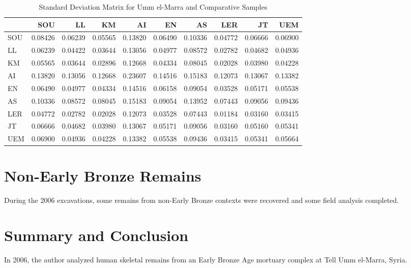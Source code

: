 \documentclass[]{book}
\begin{document}
\begin{table}

\caption{\label{tab:unnamed-chunk-6}Standard Deviation Matrix for Umm el-Marra and Comparative Samples}
\centering
\begin{tabular}[t]{l|r|r|r|r|r|r|r|r|r}
\hline
  & SOU & LL & KM & AI & EN & AS & LER & JT & UEM\\
\hline
SOU & 0.08426 & 0.06239 & 0.05565 & 0.13820 & 0.06490 & 0.10336 & 0.04772 & 0.06666 & 0.06900\\
\hline
LL & 0.06239 & 0.04422 & 0.03644 & 0.13056 & 0.04977 & 0.08572 & 0.02782 & 0.04682 & 0.04936\\
\hline
KM & 0.05565 & 0.03644 & 0.02896 & 0.12668 & 0.04334 & 0.08045 & 0.02028 & 0.03980 & 0.04228\\
\hline
AI & 0.13820 & 0.13056 & 0.12668 & 0.23607 & 0.14516 & 0.15183 & 0.12073 & 0.13067 & 0.13382\\
\hline
EN & 0.06490 & 0.04977 & 0.04334 & 0.14516 & 0.06158 & 0.09054 & 0.03528 & 0.05171 & 0.05538\\
\hline
AS & 0.10336 & 0.08572 & 0.08045 & 0.15183 & 0.09054 & 0.13952 & 0.07443 & 0.09056 & 0.09436\\
\hline
LER & 0.04772 & 0.02782 & 0.02028 & 0.12073 & 0.03528 & 0.07443 & 0.01184 & 0.03160 & 0.03415\\
\hline
JT & 0.06666 & 0.04682 & 0.03980 & 0.13067 & 0.05171 & 0.09056 & 0.03160 & 0.05160 & 0.05341\\
\hline
UEM & 0.06900 & 0.04936 & 0.04228 & 0.13382 & 0.05538 & 0.09436 & 0.03415 & 0.05341 & 0.05664\\
\hline
\end{tabular}
\end{table}

\chapter{Non-Early Bronze Remains}\label{non-early-bronze-remains}

During the 2006 excavations, some remains from non-Early Bronze contexts
were recovered and some field analysis completed.

\chapter{Summary and Conclusion}\label{summary}

In 2006, the author analyzed human skeletal remains from an Early Bronze
Age mortuary complex at Tell Umm el-Marra, Syria.


\end{document}
